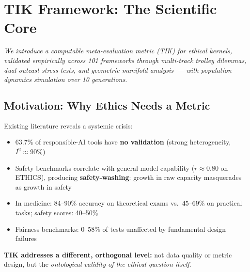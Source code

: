 \documentclass[11pt,a4paper]{article}
\theoremstyle{definition}
\theoremstyle{remark}
\begin{document}
\newpage




\section{TIK Framework: The Scientific Core}
\label{sec:tik}

\begin{scibox}
\textit{We introduce a computable meta-evaluation metric (TIK) for ethical
kernels, validated empirically across 101 frameworks through multi-track
trolley dilemmas, dual outcast stress-tests, and geometric manifold
analysis~--- with population dynamics simulation over 10 generations.}
\end{scibox}

\vspace{0.3cm}

\subsection{Motivation: Why Ethics Needs a Metric}
\label{sec:tik-motivation}

\begin{warnbox}
Existing literature reveals a systemic crisis:
\begin{itemize}[noitemsep]
  \item 63.7\% of responsible-AI tools have \textbf{no validation}
    (strong heterogeneity, $I^2 \approx 90\%$)
  \item Safety benchmarks correlate with general model capability
    ($r \approx 0.80$ on ETHICS), producing \textbf{safety-washing}:
    growth in raw capacity masquerades as growth in safety
  \item In medicine: 84--90\% accuracy on theoretical exams
    vs.\ 45--69\% on practical tasks;
    safety scores: 40--50\%
  \item Fairness benchmarks: 0--58\% of tests unaffected by
    fundamental design failures
\end{itemize}
\textbf{TIK addresses a different, orthogonal level:}
not data quality or metric design, but the
\textit{ontological validity of the ethical question itself}.
\end{warnbox}
\end{document}

